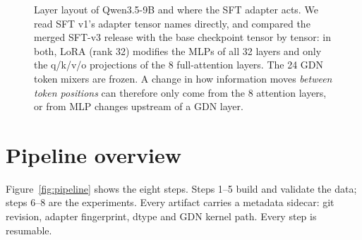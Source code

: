\documentclass[11pt,a4paper]{article}
\begin{document}
\begin{figure}[htbp]
\centering
{}
\caption{Layer layout of Qwen3.5-9B and where the SFT adapter acts. We read SFT v1's adapter
tensor names directly, and compared the merged SFT-v3 release with the base checkpoint tensor by
tensor: in both, LoRA (rank 32) modifies the MLPs of all 32 layers and only the q/k/v/o projections
of the 8 full-attention layers. The 24 GDN token mixers are frozen. A change in how information
moves \emph{between token positions} can therefore only come from the 8 attention layers, or
from MLP changes upstream of a GDN layer.}
\label{fig:arch}
\end{figure}

\section{Pipeline overview}

Figure~\ref{fig:pipeline} shows the eight steps. Steps 1--5 build and validate the data; steps 6--8
are the experiments. Every artifact carries a metadata sidecar: git revision, adapter
fingerprint, dtype and GDN kernel path. Every step is resumable.
\end{document}
